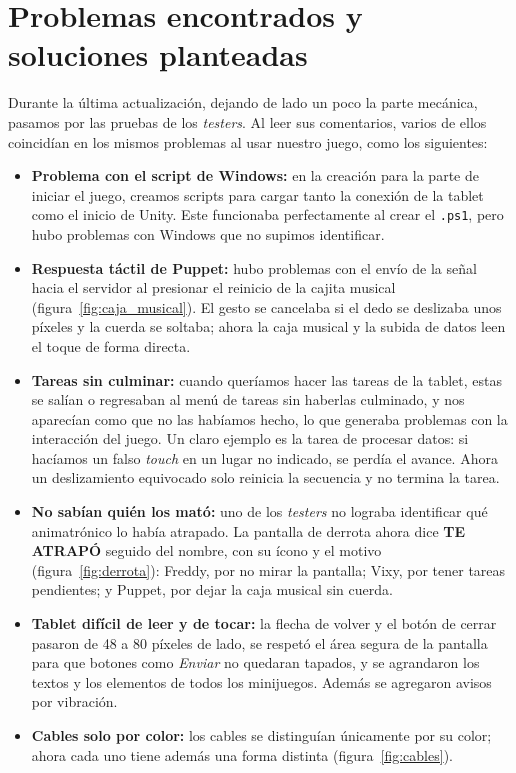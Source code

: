 \documentclass[11pt,a4paper]{article}
\newcommand{\codigo}[1]{\texttt{#1}}
\begin{document}
\section{Problemas encontrados y soluciones planteadas}
Durante la última actualización, dejando de lado un poco la parte mecánica, pasamos por las pruebas de los \textit{testers}. Al leer sus comentarios, varios de ellos coincidían en los mismos problemas al usar nuestro juego, como los siguientes:
\begin{itemize}
    \item \textbf{Problema con el script de Windows:} en la creación para la parte de iniciar el juego, creamos scripts para cargar tanto la conexión de la tablet como el inicio de Unity. Este funcionaba perfectamente al crear el \codigo{.ps1}, pero hubo problemas con Windows que no supimos identificar.
    \item \textbf{Respuesta táctil de Puppet:} hubo problemas con el envío de la señal hacia el servidor al presionar el reinicio de la cajita musical (figura~\ref{fig:caja_musical}). El gesto se cancelaba si el dedo se deslizaba unos píxeles y la cuerda se soltaba; ahora la caja musical y la subida de datos leen el toque de forma directa.
    \item \textbf{Tareas sin culminar:} cuando queríamos hacer las tareas de la tablet, estas se salían o regresaban al menú de tareas sin haberlas culminado, y nos aparecían como que no las habíamos hecho, lo que generaba problemas con la interacción del juego. Un claro ejemplo es la tarea de procesar datos: si hacíamos un falso \textit{touch} en un lugar no indicado, se perdía el avance. Ahora un deslizamiento equivocado solo reinicia la secuencia y no termina la tarea.
    \item \textbf{No sabían quién los mató:} uno de los \textit{testers} no lograba identificar qué animatrónico lo había atrapado. La pantalla de derrota ahora dice \textbf{TE ATRAPÓ} seguido del nombre, con su ícono y el motivo (figura~\ref{fig:derrota}): Freddy, por no mirar la pantalla; Vixy, por tener tareas pendientes; y Puppet, por dejar la caja musical sin cuerda.
    \item \textbf{Tablet difícil de leer y de tocar:} la flecha de volver y el botón de cerrar pasaron de 48 a 80 píxeles de lado, se respetó el área segura de la pantalla para que botones como \textit{Enviar} no quedaran tapados, y se agrandaron los textos y los elementos de todos los minijuegos. Además se agregaron avisos por vibración.
    \item \textbf{Cables solo por color:} los cables se distinguían únicamente por su color; ahora cada uno tiene además una forma distinta (figura~\ref{fig:cables}).

\end{itemize}
\end{document}

